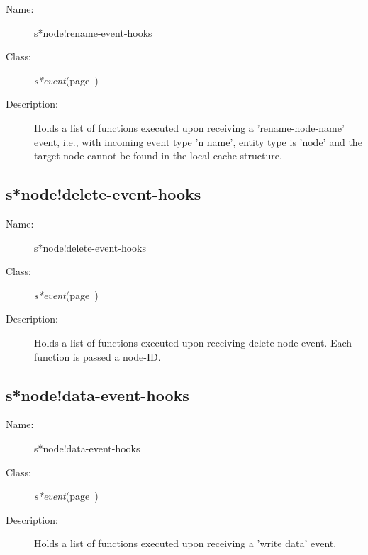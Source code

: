 \begin{description}
\item [Name:]  s*node!rename-event-hooks

\item [Class:]
{\sl s*event}\hfill(page~\pageref{s*event})

\item [Description:]
Holds a list of functions executed upon receiving a
'rename-node-name' event, i.e., with incoming event
type 'n name', entity type is 'node' and the target
node cannot be found in the local cache structure.



\end{description}
\horizontalline

\subsection{s*node!delete-event-hooks}
\label{s*node!delete-event-hooks}

\begin{description}
\item [Name:]  s*node!delete-event-hooks

\item [Class:]
{\sl s*event}\hfill(page~\pageref{s*event})

\item [Description:]
Holds a list of functions executed upon receiving
delete-node event.  Each function is passed a node-ID.



\end{description}
\horizontalline

\subsection{s*node!data-event-hooks}
\label{s*node!data-event-hooks}

\begin{description}
\item [Name:]  s*node!data-event-hooks

\item [Class:]
{\sl s*event}\hfill(page~\pageref{s*event})

\item [Description:]
Holds a list of functions executed upon receiving a
'write data' event.



\end{description}
\horizontalline

